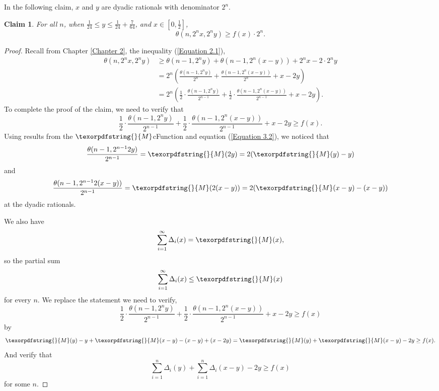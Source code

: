 \documentclass[12pt]{ucthesis}
\theoremstyle{plain}
\newtheorem{claim}{Claim}
\theoremstyle{definition}
\newcommand{\takagi}{
  \texorpdfstring{\protect}{M}
}
\begin{document}
In the following claim, $x$ and $y$ are dyadic rationals with denominator $2^n$.
\begin{claim}
\label{Claim 6}
For all $n$, when $\frac{1}{24} \le y \le \frac{1}{24} + \frac{7}{64}$,
and $x \in [0, \frac{1}{2}]$,
\begin{equation*}
\theta(n, 2^n x, 2^n y) \ge f(x) \cdot 2^n.
\end{equation*}
\end{claim}
\begin{proof}
Recall from Chapter \ref{Chapter 2}, the inequality (\ref{Equation 2.1}),
\begin{align*}
\theta(n, 2^n x, 2^n y)
& \ge \theta(n - 1, 2^n y) + \theta(n - 1, 2^n (x - y)) + 2^n x - 2 \cdot 2^n y \\
& = 2^n \left(\frac{\theta(n - 1, 2^n y)}{2^n} + \frac{\theta(n - 1, 2^n (x - y))}{2^n} + x - 2 y
	\right) \\
& = 2^n \left(\frac{1}{2} \cdot \frac{\theta(n - 1, 2^n y)}{2^{n - 1}} +
	      \frac{1}{2} \cdot \frac{\theta(n - 1, 2^n (x - y))}{2^{n - 1}} + x - 2 y
	\right).
\end{align*}
To complete the proof of the claim, we need to verify that
\begin{equation*}
\frac{1}{2} \cdot \frac{\theta(n - 1, 2^n y)}{2^{n - 1}} +
\frac{1}{2} \cdot \frac{\theta(n - 1, 2^n (x - y))}{2^{n - 1}} + x - 2 y \ge f(x).
\end{equation*}
Using results from the $\takagi$cFunction and equation (\ref{Equation 3.2}),
we noticed that
\begin{equation*}
\frac{\theta(n - 1, 2^{n - 1} 2 y)}{2^{n - 1}} = \takagi(2 y) = 2 (\takagi(y) - y)
\end{equation*}
and
\begin{equation*}
\frac{\theta(n - 1, 2^{n - 1} 2 (x - y))}{2^{n - 1}}
= \takagi(2 (x - y))
= 2 (\takagi(x - y) - (x - y))
\end{equation*}
at the dyadic rationals.

We also have
\begin{equation*}
\sum_{i = 1}^\infty \Delta_i(x) = \takagi(x),
\end{equation*}
so the partial sum
\begin{equation*}
\sum_{i = 1}^\infty \Delta_i(x) \le \takagi(x)
\end{equation*}
for every $n$.
We replace the statement we need to verify,
\begin{equation*}
\frac{1}{2} \cdot \frac{\theta(n - 1, 2^n y)}{2^{n - 1}} +
\frac{1}{2} \cdot \frac{\theta(n - 1, 2^n (x - y))}{2^{n - 1}} + x - 2 y \ge f(x)
\end{equation*}
by
\begin{equation*}
\takagi(y) - y + \takagi(x - y) - (x - y) + (x - 2 y)
= \takagi(y) + \takagi(x - y) - 2y
\ge f(x).
\end{equation*}
And verify that
\begin{equation}
\label{Equation 4.7}
\sum_{i = 1}^n \Delta_i(y) + \sum_{i = 1}^n \Delta_i(x - y) - 2 y \ge f(x)
\end{equation}
for some $n$.


\end{proof}
\end{document}
